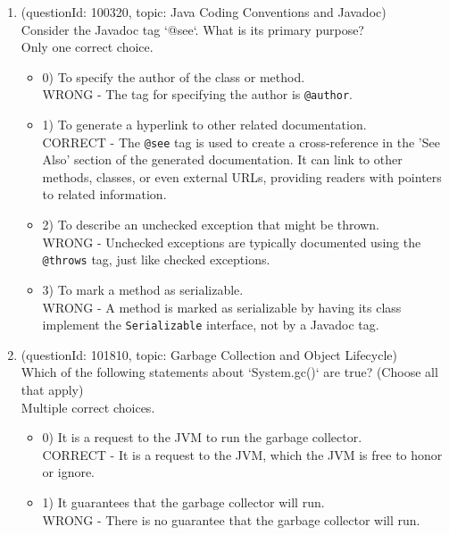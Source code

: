 \documentclass[12pt]{article}
\begin{document}
\begin{enumerate}[label=(\arabic*)]
\begin{itemize}
\end{itemize}
\item (questionId: 100320, topic: Java Coding Conventions and Javadoc) \\ 
Consider the Javadoc tag `@see`. What is its primary purpose?
\\ \noindent Only one correct choice. 
\begin{itemize}
\item 0) To specify the author of the class or method.
 \\ 
WRONG - The tag for specifying the author is \verb|@author|.

\item 1) To generate a hyperlink to other related documentation.
 \\ 
CORRECT - The \verb|@see| tag is used to create a cross-reference in the 'See Also' section of the generated documentation. It can link to other methods, classes, or even external URLs, providing readers with pointers to related information.

\item 2) To describe an unchecked exception that might be thrown.
 \\ 
WRONG - Unchecked exceptions are typically documented using the \verb|@throws| tag, just like checked exceptions.

\item 3) To mark a method as serializable.
 \\ 
WRONG - A method is marked as serializable by having its class implement the \verb|Serializable| interface, not by a Javadoc tag.

\end{itemize}
\item (questionId: 101810, topic: Garbage Collection and Object Lifecycle) \\ 
Which of the following statements about `System.gc()` are true? (Choose all that apply)
\\ \noindent Multiple correct choices. 
\begin{itemize}
\item 0) It is a request to the JVM to run the garbage collector.
 \\ 
CORRECT - It is a request to the JVM, which the JVM is free to honor or ignore.

\item 1) It guarantees that the garbage collector will run.
 \\ 
WRONG - There is no guarantee that the garbage collector will run.


\end{itemize}
\end{enumerate}
\end{document}
